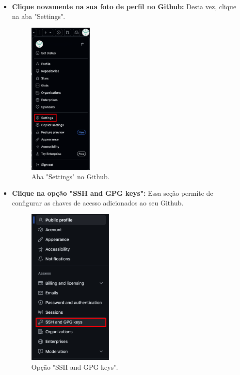 \begin{itemize}
    \item \textbf{Clique novamente na sua foto de perfil no Github:}
    Desta vez, clique na aba "Settings".

\begin{figure}[H]
\centering
\includegraphics[width=0.3\textwidth]{imgs/tutorial_criar_conta_github/7_settings.png}
\caption{Aba "Settings" no Github.}
\label{fig:aba_settings}
\end{figure}

\item \textbf{Clique na opção "SSH and GPG keys":}
Essa seção permite de configurar as chaves de acesso adicionados ao seu Github.

\begin{figure}[H]
\centering
\includegraphics[width=0.4\textwidth]{imgs/tutorial_criar_conta_github/8_ssh_keys.png}
\caption{Opção "SSH and GPG keys".}
\label{fig:ssh_keys}
\end{figure}


\end{itemize}
